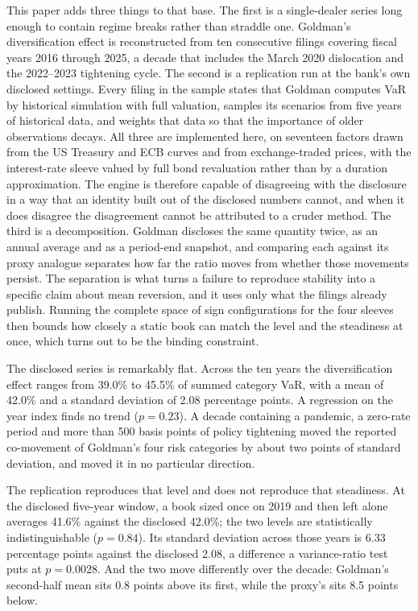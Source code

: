 This paper adds three things to that base. The first is a single-dealer series
long enough to contain regime breaks rather than straddle one. Goldman's
diversification effect is reconstructed from ten consecutive filings covering
fiscal years 2016 through 2025, a decade that includes the March 2020
dislocation and the 2022--2023 tightening cycle. The second is a replication
run at the bank's own disclosed settings. Every filing in the sample states
that Goldman computes VaR by historical simulation with full valuation, samples
its scenarios from five years of historical data, and weights that data so that
the importance of older observations decays. All three are implemented here, on
seventeen factors drawn from the US Treasury and ECB curves and from
exchange-traded prices, with the interest-rate sleeve valued by full bond
revaluation rather than by a duration approximation. The engine is therefore
capable of disagreeing with the disclosure in a way that an identity built out
of the disclosed numbers cannot, and when it does disagree the disagreement
cannot be attributed to a cruder method. The third is a decomposition. Goldman discloses the same quantity twice, as an
annual average and as a period-end snapshot, and comparing each against its
proxy analogue separates how far the ratio moves from whether those movements
persist. The separation is what turns a failure to reproduce stability into a
specific claim about mean reversion, and it uses only what the filings already
publish. Running the complete space of sign configurations for the four sleeves
then bounds how closely a static book can match the level and the steadiness at
once, which turns out to be the binding constraint.

The disclosed series is remarkably flat. Across the ten years the
diversification effect ranges from 39.0\% to 45.5\% of summed category VaR,
with a mean of 42.0\% and a standard deviation of 2.08 percentage points. A
regression on the year index finds no trend ($p = 0.23$). A decade containing a
pandemic, a zero-rate period and more than 500 basis points of policy
tightening moved the reported co-movement of Goldman's four risk categories by
about two points of standard deviation, and moved it in no particular
direction.

The replication reproduces that level and does not reproduce that steadiness.
At the disclosed five-year window, a book sized once on 2019 and then left
alone averages 41.6\% against the disclosed 42.0\%; the two levels are
statistically indistinguishable ($p = 0.84$). Its standard deviation across
those years is 6.33 percentage points against the disclosed 2.08, a difference
a variance-ratio test puts at $p = 0.0028$. And the two move differently over
the decade: Goldman's second-half mean sits 0.8 points above its first, while
the proxy's sits 8.5 points below.

